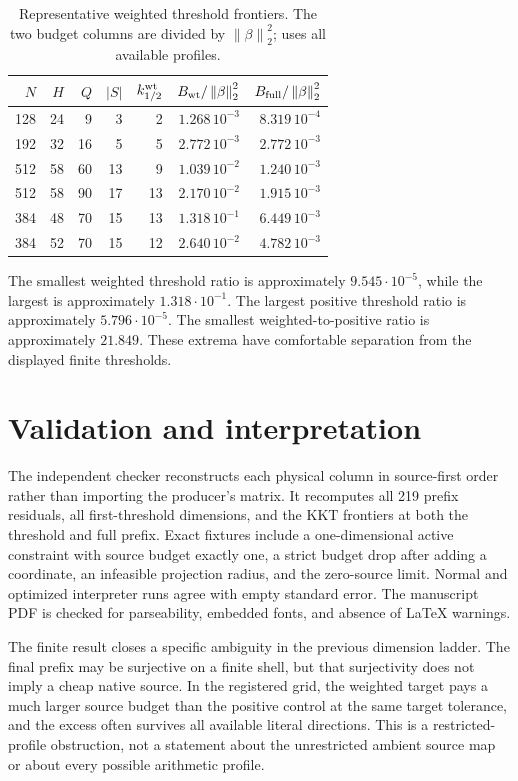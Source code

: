 \documentclass[10pt]{article}
\newcommand{\norm}[1]{\left\lVert #1\right\rVert}
\begin{document}
\begin{table}[ht]
\centering
\scriptsize
\caption{Representative weighted threshold frontiers.  The two budget
columns are divided by $\norm{\beta}_2^2$;  uses all available
profiles.}
\label{tab:rows}
\begin{tabular}{@{}rrrrrrr@{}}
\toprule
$N$ & $H$ & $Q$ & $\vert S\vert$ & $k_{1/2}^{\rm wt}$
& $B_{\rm wt}/\norm{\beta}_2^2$ & $B_{\rm full}/\norm{\beta}_2^2$\\
\midrule
128&24&9 &3 &2  & $1.268\,10^{-3}$ & $8.319\,10^{-4}$\\
192&32&16&5 &5  & $2.772\,10^{-3}$ & $2.772\,10^{-3}$\\
512&58&60&13&9 & $1.039\,10^{-2}$ & $1.240\,10^{-3}$\\
512&58&90&17&13& $2.170\,10^{-2}$ & $1.915\,10^{-3}$\\
384&48&70&15&13& $1.318\,10^{-1}$ & $6.449\,10^{-3}$\\
384&52&70&15&12& $2.640\,10^{-2}$ & $4.782\,10^{-3}$\\
\bottomrule
\end{tabular}
\end{table}

The smallest weighted threshold ratio is approximately
$9.545\cdot10^{-5}$, while the largest is approximately $1.318\cdot10^{-1}$.
The largest positive threshold ratio is approximately
$5.796\cdot10^{-5}$.  The smallest weighted-to-positive ratio is
approximately $21.849$.  These extrema have comfortable separation from
the displayed finite thresholds.

\section{Validation and interpretation}

The independent checker reconstructs each physical column in source-first
order rather than importing the producer's matrix.  It recomputes all 219
prefix residuals, all first-threshold dimensions, and the KKT frontiers at
both the threshold and full prefix.  Exact fixtures include a
one-dimensional active constraint with source budget exactly one, a strict
budget drop after adding a coordinate, an infeasible projection radius, and
the zero-source limit.  Normal and optimized interpreter runs agree with
empty standard error.  The manuscript PDF is checked for parseability,
embedded fonts, and absence of LaTeX warnings.

The finite result closes a specific ambiguity in the previous dimension
ladder.  The final prefix may be surjective on a finite shell, but that
surjectivity does not imply a cheap native source.  In the registered grid,
the weighted target pays a much larger source budget than the positive
control at the same target tolerance, and the excess often survives all
available literal directions.  This is a restricted-profile obstruction,
not a statement about the unrestricted ambient source map or about every
possible arithmetic profile.
\end{document}
